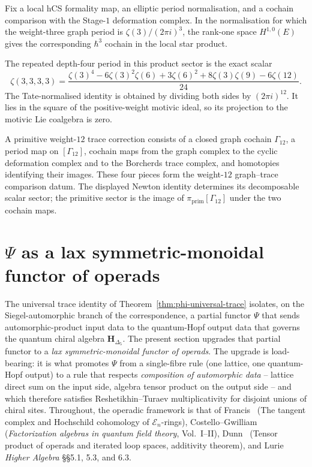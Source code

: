 \begin{remark}
\label{rem:phiutp-k3e-hbar3}
Fix a local hCS formality map, an elliptic period normalisation, and a
cochain comparison with the Stage-$1$ deformation complex.  In the
normalisation for which the weight-three graph period is
$\zeta(3)/(2\pi i)^3$, the rank-one space $H^{1,0}(E)$ gives the
corresponding $\hbar^3$ cochain in the local star product.

The repeated depth-four period in this product sector is the exact scalar
\[
 \zeta(3,3,3,3)
 =\frac{\zeta(3)^4-6\zeta(3)^2\zeta(6)+3\zeta(6)^2
 +8\zeta(3)\zeta(9)-6\zeta(12)}{24}.
\]
The Tate-normalised identity is obtained by dividing both sides by
$(2\pi i)^{12}$.
It lies in the square of the positive-weight motivic ideal, so its
projection to the motivic Lie coalgebra is zero.

A primitive weight-$12$ trace correction consists of a closed graph
cochain $\Gamma_{12}$, a period map on $[\Gamma_{12}]$, cochain maps
from the graph complex to the cyclic deformation complex and to the
Borcherds trace complex, and homotopies identifying their images.
These four pieces form the weight-$12$ graph--trace comparison datum.
The displayed Newton identity determines its decomposable scalar
sector; the primitive sector is the image of
$\pi_{\mathrm{prim}}[\Gamma_{12}]$ under the two cochain maps.
\end{remark}

\section{\texorpdfstring{$\Psi$}{Psi} as a lax symmetric-monoidal functor of operads}
\label{sec:phiutp-psi-functor-of-operads}

The universal trace identity of
Theorem~\ref{thm:phi-universal-trace} isolates, on the Siegel-automorphic
branch of the correspondence, a partial functor
$\Psi$ that sends automorphic-product input data to the quantum-Hopf
output data that governs the quantum chiral algebra
$\mathbf{H}_{\Delta_5}$. The present section upgrades that partial
functor to a \emph{lax symmetric-monoidal functor of operads}. The
upgrade is load-bearing: it is what promotes $\Psi$ from a single-fibre
rule (one lattice, one quantum-Hopf output) to a rule that respects
\emph{composition of automorphic data} -- lattice direct sum on the
input side, algebra tensor product on the output side -- and which
therefore satisfies Reshetikhin--Turaev multiplicativity for disjoint
unions of chiral sites. Throughout, the operadic framework is that
of Francis~\cite{Francis2013} (The tangent complex and Hochschild
cohomology of $\mathcal{E}_n$-rings), Costello--Gwilliam
\cite{CostelloGwilliam2017} (\emph{Factorization algebras in quantum
field theory}, Vol.~I--II), Dunn~\cite{Dunn1988} (Tensor product of
operads and iterated loop spaces, additivity theorem), and
Lurie~\cite{LurieHA} \emph{Higher Algebra} \S\S5.1, 5.3, and 6.3.

